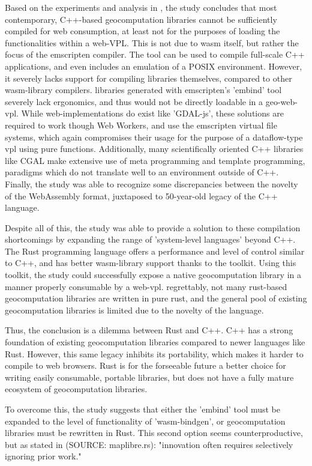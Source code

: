 Based on the experiments and analysis in , the study concludes that most contemporary, C++-based geocomputation libraries cannot be sufficiently compiled for web consumption, at least not for the purposes of loading the functionalities within a web-VPL.    
This is not due to wasm itself, but rather the focus of the emscripten compiler.
The tool can be used to compile full-scale C++ applications, and even includes an emulation of a POSIX environment.
However, it severely lacks support for compiling libraries themselves, compared to other wasm-library compilers.
libraries generated with emscripten's 'embind' tool severely lack ergonomics, and thus would not be directly loadable in a geo-web-vpl.
While web-implementations do exist like 'GDAL-js', these solutions are required to work though Web Workers, and use the emscripten virtual file systems, which again compromises their usage for the purpose of a dataflow-type vpl using pure functions.
Additionally, many scientifically oriented C++ libraries like CGAL make extensive use of meta programming and template programming, paradigms which do not translate well to an environment outside of C++. 
Finally, the study was able to recognize some discrepancies between the novelty of the WebAssembly format, juxtaposed to 50-year-old legacy of the C++ language.

Despite all of this, the study was able to provide a solution to these compilation shortcomings by expanding the range of 'system-level languages' beyond C++. 
The Rust programming language offers a performance and level of control similar to C++, and has better wasm-library support thanks to the  toolkit. 
Using this toolkit, the study could successfully expose a native geocomputation library in a manner properly consumable by a web-vpl.
regrettably, not many rust-based geocomputation libraries are written in pure rust, and the general pool of existing geocomputation libraries is limited due to the novelty of the language. 

Thus, the conclusion is a dilemma between Rust and C++.
C++ has a strong foundation of existing geocomputation libraries compared to newer languages like Rust.  
However, this same legacy inhibits its portability, which makes it harder to compile to web browsers. 
Rust is for the forseeable future a better choice for writing easily consumable, portable libraries, but does not have a fully mature ecosystem of geocomputation libraries. 

To overcome this, the study suggests that either the 'embind' tool must be expanded to the level of functionality of 'wasm-bindgen', or geocomputation libraries must be rewritten in Rust. 
This second option seems counterproductive, but as stated in (SOURCE: maplibre.rs): "innovation often requires selectively ignoring prior work."

